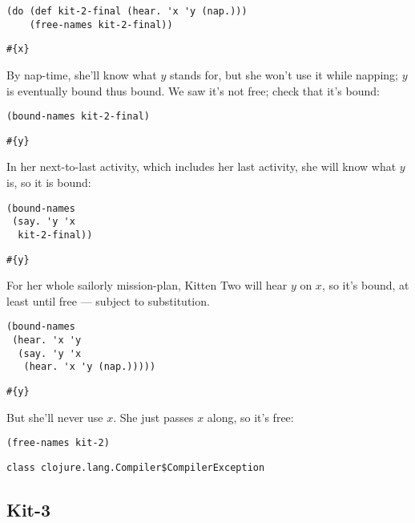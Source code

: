 \documentclass[10pt,oneside,x11names]{article}
\theoremstyle{definition}
\theoremstyle{warning}
\begin{document}
\vskip 0.26cm
\begin{verbatim}
(do (def kit-2-final (hear. 'x 'y (nap.)))
    (free-names kit-2-final))
\end{verbatim}

\begin{verbatim}
#{x}
\end{verbatim}


By nap-time, she'll know what \(y\) stands for, but she won't use it
while napping; \(y\) is eventually bound thus bound. We saw it's not
free; check that it's bound:

\vskip 0.26cm
\begin{verbatim}
(bound-names kit-2-final)
\end{verbatim}

\begin{verbatim}
#{y}
\end{verbatim}


In her next-to-last activity, which includes her last activity,
she will know what \(y\) is, so it is bound:

\vskip 0.26cm
\begin{verbatim}
(bound-names
 (say. 'y 'x
  kit-2-final))
\end{verbatim}

\begin{verbatim}
#{y}
\end{verbatim}


For her whole sailorly mission-plan, Kitten Two will hear \(y\) on
\(x\), so it's bound, at least until free --- subject to
substitution.

\vskip 0.26cm
\begin{verbatim}
(bound-names
 (hear. 'x 'y
  (say. 'y 'x
   (hear. 'x 'y (nap.)))))
\end{verbatim}

\begin{verbatim}
#{y}
\end{verbatim}


But she'll never use \(x\). She just passes \(x\) along, so it's free:

\vskip 0.26cm
\begin{verbatim}
(free-names kit-2)
\end{verbatim}

\begin{verbatim}
class clojure.lang.Compiler$CompilerException
\end{verbatim}

\subsection{Kit-3}
\label{sec:org11f3c3e}
\end{document}
